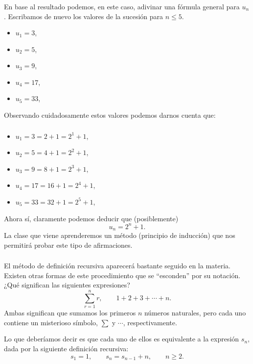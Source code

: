 \documentclass{beamer}
\begin{document}
\begin{frame}\frametitle{} 
 En base al resultado podemos,  en este caso, adivinar una fórmula general para $u_n$. Escribamos de nuevo los valores de la sucesión para $n \le 5$. 
 
 \medspace \pause 
 
 \begin{itemize}
  	\item $ u_1=3$, \pause 
 	\item $u_2=5$,\pause 
 	\item $u_{3} = 9$,\pause 
 	\item $u_{4} = 17$,\pause 
 	\item $u_{5} = 33$,
\end{itemize}

\medspace 
\pause 
\pause Observando cuidadosamente estos valores podemos darnos cuenta que:
	
\end{frame}

\begin{frame}\frametitle{} 

	\begin{itemize}
		\item $ u_1=3 = 2 +1 = 2^1 + 1$, \pause 
		\item $u_2=5 = 4 +1 = 2^2 + 1$,\pause 
		\item $u_{3} = 9 = 8 +1 = 2^3 + 1$,\pause 
		\item $u_{4} = 17 = 16 +1 = 2^4 + 1$,\pause 
		\item $u_{5} = 33 = 32 +1 = 2^5 + 1$,\pause 
	\end{itemize}
\medspace 

Ahora sí,  claramente podemos deducir que (posiblemente) 
$$u_{n} =  2^n + 1.$$ \pause 
La clase que viene aprenderemos un método (principio de inducción) que nos permitirá probar este tipo de afirmaciones. 
	
\end{frame}



\begin{frame}\frametitle{} 
	El método de definición recursiva aparecerá bastante seguido en la materia. Existen otras formas de este procedimiento que se ``esconden'' por su notación. \pause ¿Qué significan las siguientes expresiones?
	$$
	\sum_{r=1}^{n} r,\qquad 1+2+3+\cdots +n.
	$$\pause 
	Ambas significan que sumamos los primeros $n$ números naturales, pero cada uno contiene un misterioso símbolo, $\sum$ y $\cdots$,
	respectivamente. 
	
	\medspace 
	\pause 
	Lo que deberíamos decir es que cada uno de ellos
	es equivalente a la expresión $s_n$, dada por la siguiente
	definición recursiva:\pause 
	$$
	s_1= 1, \qquad s_n = s_{n-1} + n, \qquad n\ge 2.
	$$
	
	
\end{frame}
\end{document}
